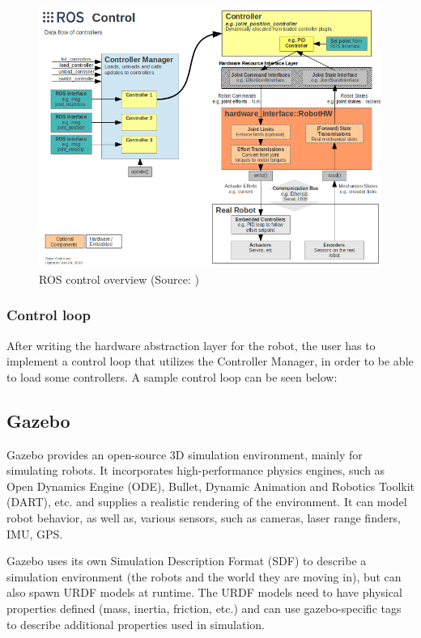 \documentclass[english,inz,shortabstract]{iithesis}
\begin{document}
	
	\begin{figure}[ht]
		\centering
		\includegraphics[width=\textwidth]{img/ros_control.png}
		\caption{ROS control overview (Source: \cite{ros_control:wiki})}
		\label{fig:ros_control}
	\end{figure}

	\subsubsection{Control loop}
	After writing the hardware abstraction layer for the robot, the user has to implement a control loop that utilizes the Controller Manager, in order to be able to load some controllers. A sample control loop can be seen below:

	

\pagebreak

	\subsection{Gazebo}
	Gazebo provides an open-source 3D simulation environment, mainly for simulating robots. It incorporates high-performance physics engines, such as Open Dynamics Engine (ODE), Bullet, Dynamic Animation and Robotics Toolkit (DART), etc. and supplies a realistic rendering of the environment. It can model robot behavior, as well as, various sensors, such as cameras, laser range finders, IMU, GPS.

	Gazebo uses its own Simulation Description Format (SDF) to describe a simulation environment (the robots and the world they are moving in), but can also spawn URDF models at runtime. The URDF models need to have physical properties defined (mass, inertia, friction, etc.) and can use gazebo-specific tags to describe additional properties used in simulation.
\end{document}
